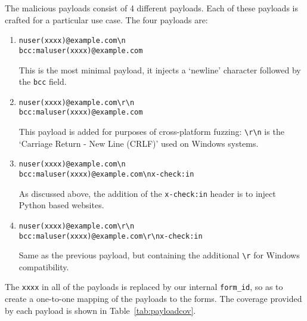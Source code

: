The malicious payloads consist of 4 different payloads. Each of these payloads is crafted for a particular use case. The four payloads are:
\lstset{language=html}
\begin{enumerate}
	\item
	\texttt{nuser(xxxx)@example.com\textbackslash{}n\\bcc:maluser(xxxx)@example.com} 
	
	This is the most minimal payload, it injects a `newline' character followed by the \texttt{bcc} field.
	
	\item \texttt{nuser(xxxx)@example.com\textbackslash{}r\textbackslash{}n\\bcc:maluser(xxxx)@example.com}
	
	This payload is added for purposes of cross-platform fuzzing: \texttt{\textbackslash{}r\textbackslash{}n} is the `Carriage Return - New Line (CRLF)' used on Windows systems. 
	
	\item \texttt{nuser(xxxx)@example.com\textbackslash{}n\\bcc:maluser(xxxx)@example.com\textbackslash{}nx-check:in}
	
	As discussed above, the addition of the \texttt{x-check:in} header is to inject Python based websites.
	
	\item \texttt{nuser(xxxx)@example.com\textbackslash{}r\textbackslash{}n\\bcc:maluser(xxxx)@example.com\textbackslash{}r\textbackslash{}nx-check:in}
	
	Same as the previous payload, but containing the additional \texttt{\textbackslash{}r} for Windows compatibility.
	
\end{enumerate}
The \texttt{xxxx} in all of the payloads is replaced by our internal \texttt{form\_id}, so as to create a one-to-one mapping of the payloads to the forms. The coverage provided by each payload is shown in Table~\ref{tab:payloadcov}.\\

